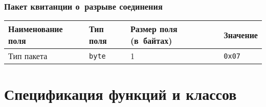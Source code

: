 \documentclass[a4paper,12pt]{article}
\begin{document}
\subsubsection{Пакет квитанции о~разрыве соединения}
\begin{center}
\begin{tabular}{|l|l|l|l|}
\hline
Наименование поля	&	Тип поля	&	Размер поля (в~байтах)	&	Значение\\\hline
Тип пакета	&	\texttt{byte}	&	1	&	\texttt{0x07}\\\hline
\end{tabular}
\end{center}

\section{Спецификация функций и классов}
\end{document}
